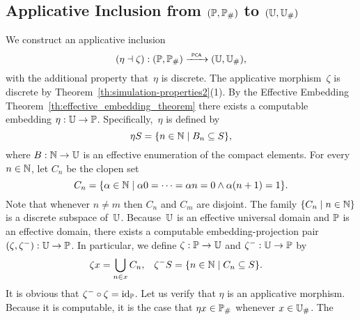 
\subsection{Applicative Inclusion from $(\Scott, \comp{\Scott})$ to $(\UU,
  \comp{\UU})$}
\label{sec:app_mor_PP_UU}%

%
%

We construct an applicative inclusion
\begin{equation*}
  (\eta \dashv \zeta): (\Scott, \comp{\Scott}) \pcato (\UU, \comp{\UU}),
\end{equation*}
with the additional property that~$\eta$ is discrete. The applicative
morphism~$\zeta$ is discrete by
Theorem~\ref{th:simulation-properties2}(1). By the Effective
Embedding Theorem~\ref{th:effective_embedding_theorem} there exists a
computable embedding $\eta: \UU \to \Scott$. Specifically,~$\eta$ is
defined by
%
\begin{equation*}
  \eta S = \set{ n \in \NN \such B_n \subseteq S },
\end{equation*}
%
where $B : \NN \to \UU$ is an effective enumeration of the compact elements. For every $n \in \NN$, let $C_n$ be the clopen set
%
\begin{equation*}
  C_n = \set{ \alpha \in \NN \such
    \alpha 0 = \cdots = \alpha n = 0 \land \alpha (n+1) = 1
    }.
\end{equation*}
%
Note that whenever $n \neq m$ then $C_n$ and $C_m$ are disjoint. The
family $\set{C_n \such n \in \NN}$ is a discrete subspace of~$\UU$.
Because~$\UU$ is an effective universal domain and $\Scott$ is an
effective domain, there exists a computable embedding-projection pair
$(\zeta, \zeta^{-}): \UU \to \Scott$. In particular, we define
$\zeta: \Scott \to \UU$ and $\zeta^{-}: \UU \to \Scott$ by
%
\begin{align*}
  \zeta x &= \bigcup_{n \in x} C_n,
  &
  \zeta^{-} S &= \set{n \in \NN \such C_n \subseteq S}.
\end{align*}
%
It is obvious that $\zeta^{-} \circ \zeta = \id[\Scott]$. Let us verify
that $\eta$ is an applicative morphism. Because it is computable, it
is the case that $\eta x \in \comp{\Scott}$ whenever $x \in \comp{\UU}$. The
